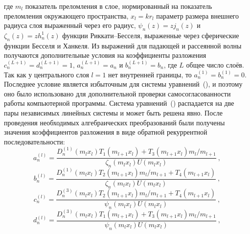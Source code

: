 где $m_l$ показатель преломления в слое, нормированный на показатель
преломления окружающего пространства, $x_l=kr_l$ параметр размера
внешнего радиуса слоя выраженный через его радиус,
$\psi_{n}(z) = z j_n(z)$ и $\zeta_{n}(z) = z h_n^1(z)$ функции
Риккати--Бесселя, выраженные через сферические функции Бесселя и
Ханкеля.  Из выражений для падающей и рассеянной волны получаются
дополнительные условия на коэффициенты разложения
$c_n^{(L+1)}=d_n^{(L+1)}=1$, $a_n^{(L+1)}=a_n$ и $b_n^{(L+1)}=b_n$,
где $L$ общее число слоёв. Так как у центрального слоя $l=1$ нет
внутренней границы, то $a_n^{(1)}=b_n^{(1)}=0$. Последнее условие
является избыточным для системы
уравнений~(), и поэтому оно
было использовано для дополнительной проверки самосогласованности
работы компьютерной программы.  Система
уравнений~() распадается на
две пары независимых линейных системы и может быть решена явно. После
проведения необходимых алгебраических преобразований были получены
значения коэффициентов разложения в виде обратной рекуррентной
последовательности:
\begin{equation}
\label{eq:6p1}
a^{(l)}_n = \frac
{
    {D^{(1)}_{n}}{\left (m_{l} x_{l} \right )}
    T_1\left (m_{l+1} x_{l} \right )
    +
    T_3\left (m_{l+1} x_{l} \right )
    m_{l}/m_{l+1}
}
{
   \zeta_{n}\left (m_{l} x_{l} \right )
   U\left (m_{l} x_{l} \right )
}\:,
\end{equation}
\begin{equation}
\label{eq:6p2}
b^{(l)}_n = \frac
{
    {D^{(1)}_{n}}{\left (m_{l} x_{l} \right )}
    T_2\left (m_{l+1} x_{l} \right )
    m_{l}/m_{l+1}
    +
    T_4\left (m_{l+1} x_{l} \right )
}
{
   \zeta_{n}\left (m_{l} x_{l} \right )
   U\left (m_{l} x_{l} \right )
}\:,
\end{equation}
\begin{equation}
\label{eq:6p3}
c^{(l)}_n = \frac
{
    {D^{(3)}_{n}}{\left (m_{l} x_{l} \right )}
    T_2\left (m_{l+1} x_{l} \right )
    m_{l}/m_{l+1}
    +
    T_4\left (m_{l+1} x_{l} \right )
}
{
   \psi_{n}\left (m_{l} x_{l} \right )
   U\left (m_{l} x_{l} \right )
}\:,
\end{equation}
\begin{equation}
\label{eq:6p4}
d^{(l)}_n = \frac
{
    {D^{(3)}_{n}}{\left (m_{l} x_{l} \right )}
    T_1\left (m_{l+1} x_{l} \right )
    +
    T_3\left (m_{l+1} x_{l} \right )
    m_{l}/m_{l+1}
}
{
   \psi_{n}\left (m_{l} x_{l} \right )
   U\left (m_{l} x_{l} \right )
}\:,
\end{equation}
